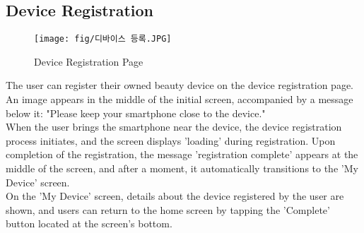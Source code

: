 \documentclass[conference]{IEEEtran}
\begin{document}
\subsection{Device Registration}
    \begin{figure}[h]
    \centering
    \texttt{[image: fig/디바이스 등록.JPG]}
    \label{fig:Device Registration Page}
    \caption{Device Registration Page} 
    \end{figure}
The user can register their owned beauty device on the device registration page. An image appears in the middle of the initial screen, accompanied by a message below it: "Please keep your smartphone close to the device."\\
When the user brings the smartphone near the device, the device registration process initiates, and the screen displays 'loading' during registration. Upon completion of the registration, the message 'registration complete' appears at the middle of the screen, and after a moment, it automatically transitions to the 'My Device' screen.\\
On the 'My Device' screen, details about the device registered by the user are shown, and users can return to the home screen by tapping the 'Complete' button located at the screen's bottom.\\
    
\end{document}
